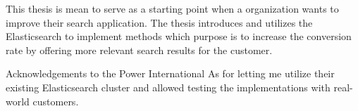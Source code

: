 This thesis is mean to serve as a starting point when a organization
wants to improve their search application. 
The thesis introduces and utilizes the Elasticsearch to implement 
methods which purpose is to increase the conversion rate by 
offering more relevant search results for the customer.


Acknowledgements to the Power International As for letting me utilize their
existing Elasticsearch cluster and allowed testing the implementations 
with real-world customers.